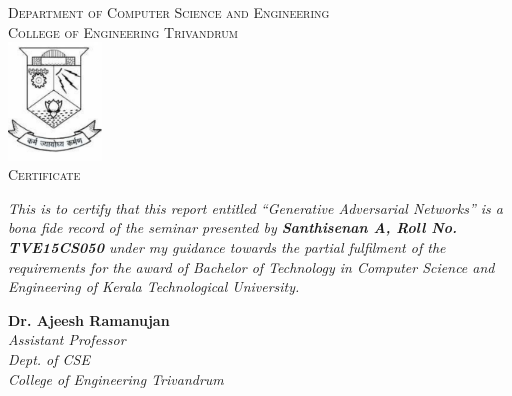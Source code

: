 \documentclass[12pt, a4paper]{report}
\begin{document}
    \begin{center}
        \textsc{\Large{Department of Computer Science and Engineering}}\\[0.25cm]
        \textsc{\Large{College of Engineering Trivandrum}}\\[0.75cm]
        \includegraphics[width=2.5cm]{images/emblem.pdf}\\[1cm]
        
        \textsc{\LARGE{Certificate}}\\
        \justify
        \begin{doublespace}
            \textit{This is to certify that this report entitled 
            “Generative Adversarial Networks” is a bona fide record of the seminar 
            presented by \textbf{Santhisenan A, Roll No. TVE15CS050} under my 
            guidance towards the partial fulfilment of the requirements for the 
            award of Bachelor of Technology in Computer Science and Engineering of 
            Kerala Technological University.}\\[1cm]
        \end{doublespace}

        \begin{minipage}{0.4\textwidth}
        \begin{flushleft}
        \noindent\textbf{Dr. Ajeesh Ramanujan}\\[0.25cm]
        \textit{Assistant Professor\\[0.25cm]
        Dept. of CSE\\[0.25cm]
        College of Engineering
        Trivandrum}
        \end{flushleft}
        \end{minipage}

    \end{center}
\end{document}

